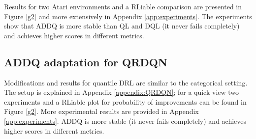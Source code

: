 \documentclass{article}
\newcommand{\E}{\mathbb{E}}
\DeclareMathOperator{\argmax}{arg\,max}
\theoremstyle{plain}
\theoremstyle{definition}
\theoremstyle{remark}
\begin{document}

Results for two Atari environments and a RLiable comparison \cite{RLiable} are presented in Figure \ref{g2} and more extensively in Appendix \ref{app:experiments}. The experiments show that ADDQ is more stable than QL and DQL (it never fails completely) and achieves higher scores in different metrics.

\subsection{ADDQ adaptation for QRDQN} Modifications and results for quantile DRL \cite{dabney2018} are similar to the categorical setting. The setup is explained in Appendix \ref{appendix:QRDQN}; for a quick view two experiments and a RLiable plot for probability of improvements can be found in Figure \ref{g2}. More experimental results are provided in Appendix \ref{app:experiments}. ADDQ is more stable (it never fails completely) and achieves higher scores in different metrics.
\end{document}
